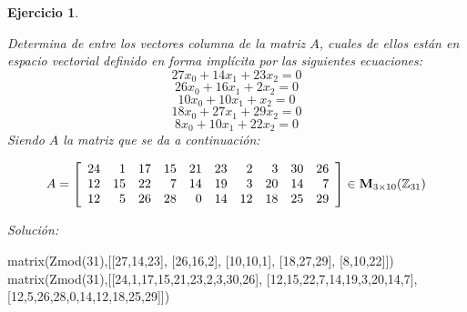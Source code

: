 \documentclass[12pt]{amsart}
\newtheorem{ejer}{Ejercicio}
\begin{document}
\begin{ejer}
\begin{minipage}{\textwidth}
\begin{tcolorbox}[colback = red!20!white,title=Versión Ecuaciones Implícitas]
Determina de entre los vectores columna de la matriz $A$, cuales de ellos están en espacio vectorial definido en forma implícita por las siguientes ecuaciones:
\[ 27 x_{0} + 14 x_{1} + 23 x_{2} = 0 \]
\[ 26 x_{0} + 16 x_{1} + 2 x_{2} = 0 \]
\[ 10 x_{0} + 10 x_{1} + x_{2} = 0 \]
\[ 18 x_{0} + 27 x_{1} + 29 x_{2} = 0 \]
\[ 8 x_{0} + 10 x_{1} + 22 x_{2} = 0 \]
Siendo $A$ la matriz que se da a continuación:
\end{tcolorbox}
\end{minipage}
\[ A = \left[\begin{array}{rrrrrrrrrr}
24 & 1 & 17 & 15 & 21 & 23 & 2 & 3 & 30 & 26 \\
12 & 15 & 22 & 7 & 14 & 19 & 3 & 20 & 14 & 7 \\
12 & 5 & 26 & 28 & 0 & 14 & 12 & 18 & 25 & 29
\end{array}\right] \in {\bf M}_{3\times 10}({\mathbb Z}_{31})\]
\end{ejer}

{\it Soluci\'on:}

\begin{sageblock}
matrix(Zmod(31),[[27,14,23],
[26,16,2],
[10,10,1],
[18,27,29],
[8,10,22]])
matrix(Zmod(31),[[24,1,17,15,21,23,2,3,30,26],
[12,15,22,7,14,19,3,20,14,7],
[12,5,26,28,0,14,12,18,25,29]])
\end{sageblock}

\end{document}
